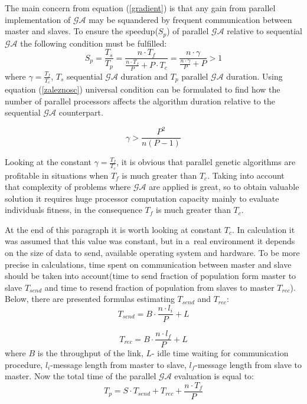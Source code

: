 The main concern from equation (\ref{gradient}) is that any gain from parallel
implementation of $\mathcal{GA}$ may be squandered by frequent communication
between master and slaves. 
To ensure the speedup($S_p$) of parallel $\mathcal{GA}$ relative to sequential  $\mathcal{GA}$
the following condition must be fulfilled:
\begin{equation}
	S_p=\frac{T_s}{T_p}=\frac{n\cdot T_f}{\frac{n\cdot T_f}{P}+P\cdot
	T_c}=\frac{n\cdot \gamma}{\frac{n\cdot \gamma}{P}+P} > 1
	\label{zaleznosc}
\end{equation}
where $\gamma=\frac{T_f}{T_c}$, $T_s$ sequential
$\mathcal{GA}$ duration and $T_p$ parallel $\mathcal{GA}$ duration. 
Using equation (\ref{zaleznosc}) universal condition can be formulated to find how
the number of parallel processors affects the algorithm duration relative to the
sequential $\mathcal{GA}$ counterpart. 

\begin{equation}
	\gamma>\frac{P^2}{n(P-1)}
	\label{condition}
\end{equation}

Looking at the constant $\gamma=\frac{T_f}{T_c}$, it is obvious that parallel
genetic algorithms are profitable in situations when $T_f$ is much greater than
$T_c$. Taking into account that complexity of problems where  $\mathcal{GA}$ are
applied is great, so to obtain valuable solution it requires huge processor
computation capacity mainly to evaluate
individuals fitness, in the consequence $T_f$ is
much greater than $T_c$.


At the end of this paragraph it is worth looking at constant $T_c$. In
calculation it was assumed that this value was constant, but in a~real environment
it depends on the size of data to send, available operating system and hardware. To be
more precise in calculations, time spent on communication between master and
slave should be taken into account(time to send fraction of population form
master to slave $T_{send}$ and time to resend fraction of population from
slaves to master $T_{rec}$). Below, there are presented formulas estimating
$T_{send}$ and $T_{rec}$:
\begin{equation}
	T_{send}=B\cdot \frac{n\cdot l_i}{P}+L
	\label{send}
\end{equation}

\begin{equation}
	T_{rec}=B\cdot \frac{n\cdot l_f}{P}+L
	\label{rec}
\end{equation}
where $B$ is the throughput of the link, $L$- idle time waiting for
communication procedure,  $l_i$-message length from master to
slave, $l_f$-message length from slave to master.
Now the total time of the parallel $\mathcal{GA}$ evaluation is equal to:
\begin{equation}
	T_p=S\cdot T_{send}+T_{rec}+\frac{n\cdot T_f}{P}
	\label{total2}
\end{equation}

